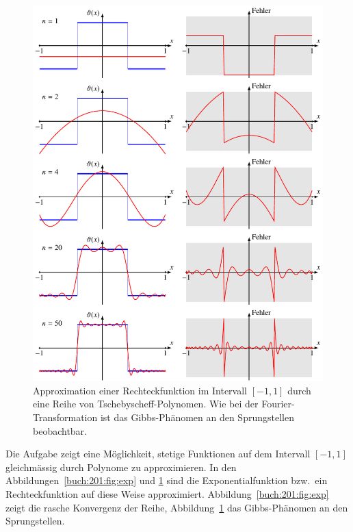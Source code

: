 \begin{figure}
\centering
\includegraphics{chapters/020-orthofkt/images/chebrect.pdf}
\caption{Approximation einer Rechteckfunktion im Intervall
$[-1,1]$ durch eine Reihe von Tschebyscheff-Polynomen.
Wie bei der Fourier-Transformation ist das Gibbs-Phänomen
an den Sprungstellen beobachtbar.
\label{buch:201:fig:rect}}
\end{figure}

Die Aufgabe zeigt eine Möglichkeit, stetige Funktionen auf dem Intervall
$[-1,1]$ gleichmässig durch Polynome zu approximieren.
In den Abbildungen~\ref{buch:201:fig:exp} und \ref{buch:201:fig:rect}
sind die Exponentialfunktion bzw.~ein Rechteckfunktion auf diese
Weise approximiert.
Abbildung~\ref{buch:201:fig:exp} zeigt die rasche Konvergenz
der Reihe,
Abbildung~\ref{buch:201:fig:rect} das Gibbs-Phänomen an den
Sprungstellen.



